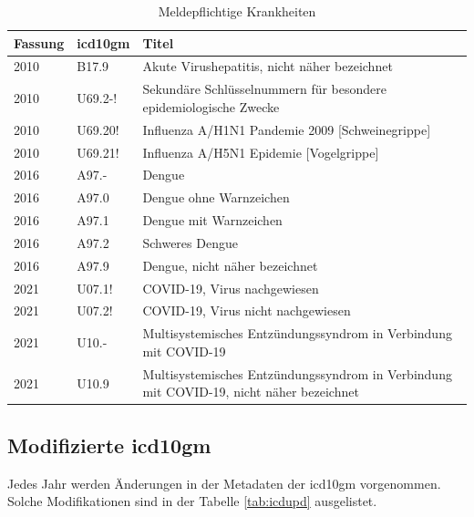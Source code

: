 \begin{table}[ht]
	\centering
	\small
	\caption[Meldepflichtige \acs{icd10gm}]{Meldepflichtige Krankheiten}
	\label{tab:meldung}
	\begin{tabular}{|l|l|p{10.5cm}|}
		\hline
		\rowcolor{lightgray} Fassung & \acs{icd10gm} & Titel \\ \hline
		2010 & B17.9 & Akute Virushepatitis, nicht näher bezeichnet \\ \hline
		2010 & U69.2-! & Sekundäre Schlüsselnummern für besondere epidemiologische Zwecke \\ \hline
		2010 & U69.20! & Influenza A/H1N1 Pandemie 2009 [Schweinegrippe] \\ \hline
		2010 & U69.21! & Influenza A/H5N1 Epidemie [Vogelgrippe] \\ \hline
		2016 & A97.- & Dengue \\ \hline
		2016 & A97.0 & Dengue ohne Warnzeichen \\ \hline
		2016 & A97.1 & Dengue mit Warnzeichen \\ \hline
		2016 & A97.2 & Schweres Dengue \\ \hline
		2016 & A97.9 & Dengue, nicht näher bezeichnet \\ \hline
		2021 & U07.1! & COVID-19, Virus nachgewiesen \\ \hline
		2021 & U07.2! & COVID-19, Virus nicht nachgewiesen \\ \hline
		2021 & U10.- & Multisystemisches Entzündungssyndrom in Verbindung mit COVID-19 \\ \hline
		2021 & U10.9 & Multisystemisches Entzündungssyndrom in Verbindung mit COVID-19, nicht näher bezeichnet \\ \hline
	\end{tabular}
\end{table}

\subsection{Modifizierte \acs{icd10gm}} \label{updicd}

Jedes Jahr werden Änderungen in der Metadaten der \ac{icd10gm} vorgenommen. Solche Modifikationen sind in der Tabelle \ref{tab:icdupd} ausgelistet. 

\clearpage

